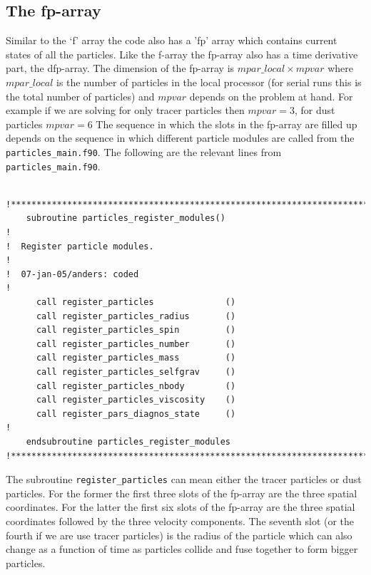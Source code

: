 \documentclass[\mydriver,12pt,twoside,notitlepage,a4paper]{article}
\newcommand{\code}[1]{\texttt{#1}}
\begin{document}
%
\subsection{The fp-array}
\label{fp-array}

Similar to the `f' array the code also has a 'fp' array which contains current
states of all the particles. Like the f-array the fp-array also has a time
derivative part, the dfp-array. The dimension of the fp-array is
$mpar\_local\times mpvar$ where $mpar\_local$ is the number of particles in the
local processor (for serial runs this is the total number of particles) and
$mpvar$ depends on the problem at hand. For example if we are solving for only
tracer particles then $mpvar=3$, for dust particles $mpvar=6$  The sequence in
which the slots in the fp-array are filled up depends on the sequence in which
different particle modules are called from the \code{particles_main.f90}. The
following are the relevant lines from \code{particles_main.f90}.
\begin{verbatim}

!***********************************************************************
    subroutine particles_register_modules()
!
!  Register particle modules.
!
!  07-jan-05/anders: coded
!
      call register_particles              ()
      call register_particles_radius       ()
      call register_particles_spin         ()
      call register_particles_number       ()
      call register_particles_mass         ()
      call register_particles_selfgrav     ()
      call register_particles_nbody        ()
      call register_particles_viscosity    ()
      call register_pars_diagnos_state     ()
!
    endsubroutine particles_register_modules
!***********************************************************************
\end{verbatim}

The subroutine \code{register_particles} can mean either the tracer particles
or dust particles. For the former the first three slots of the fp-array are the
three spatial coordinates. For the latter the first six slots of the fp-array
are the three spatial coordinates followed by the three velocity components.
The seventh slot (or the fourth if we are use tracer particles) is the radius
of the particle which can also change as a function of time as particles
collide and fuse together to form bigger particles.
\end{document}
